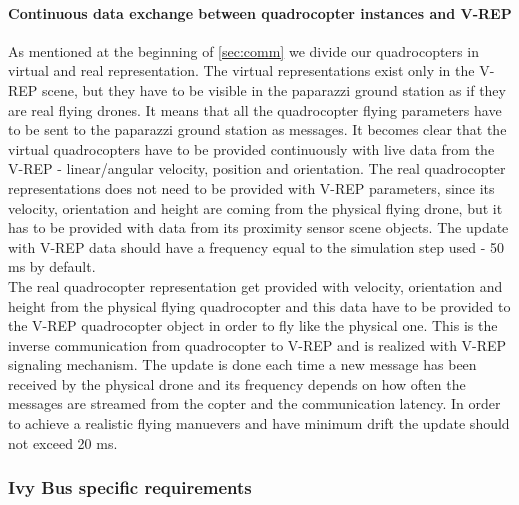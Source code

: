 \paragraph{Continuous data exchange between quadrocopter instances and V-REP}

As mentioned at the beginning of \ref{sec:comm} we divide our quadrocopters in virtual and real representation. The virtual representations exist only in the V-REP scene, but they have to be visible in the paparazzi ground station as if they are real flying drones. It means that all the quadrocopter flying parameters have to be sent to the paparazzi ground station as messages. It becomes clear that the virtual quadrocopters have to be provided continuously with live data from the V-REP - linear/angular velocity, position and orientation. The real quadrocopter representations does not need to be provided with V-REP parameters, since its velocity, orientation and height are coming from the physical flying drone, but it has to be provided with data from its proximity sensor scene objects. The update with V-REP data should have a frequency equal to the simulation step used - 50 ms by default.\\
The real quadrocopter representation get provided with velocity, orientation and height from the physical flying quadrocopter and this data have to be provided to the V-REP quadrocopter object in order to fly like the physical one. This is the inverse communication from quadrocopter to V-REP and is realized with V-REP signaling mechanism. The update is done each time a new message has been received by the physical drone and its frequency depends on how often the messages are streamed from the copter and the communication latency. In order to achieve a realistic flying manuevers and have minimum drift the update should not exceed 20 ms.

\subsubsection{Ivy Bus specific requirements}




 

